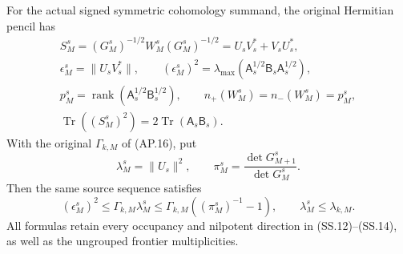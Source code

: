 \begin{theorem}
For the actual signed symmetric cohomology summand, the original
Hermitian pencil has
\[
 \begin{gathered}
 S_M^s=(G_M^s)^{-1/2}W_M^s(G_M^s)^{-1/2}
                           =U_sV_s^*+V_sU_s^*,\\
 \boxed{\epsilon_M^s=\|U_sV_s^*\|,\qquad
 (\epsilon_M^s)^2=
    \lambda_{\max}(\mathsf A_s^{1/2}\mathsf B_s
                                      \mathsf A_s^{1/2}),}\\
 p_M^s=\operatorname{rank}(\mathsf A_s^{1/2}\mathsf B_s^{1/2}),
 \qquad n_+(W_M^s)=n_-(W_M^s)=p_M^s,\\
 \operatorname{Tr}((S_M^s)^2)
                           =2\operatorname{Tr}(\mathsf A_s\mathsf B_s).
 \end{gathered}                                                \tag{AP.29}
\]
With the original \(\Gamma_{k,M}\) of (AP.16), put
\[
 \lambda_M^s=\|U_s\|^2,\qquad
 \pi_M^s=\frac{\det G_{M+1}^s}{\det G_M^s}.
\]
Then the same source sequence satisfies
\[
 \boxed{(\epsilon_M^s)^2\le\Gamma_{k,M}\lambda_M^s
          \le\Gamma_{k,M}((\pi_M^s)^{-1}-1),\qquad
          \lambda_M^s\le\lambda_{k,M}.}              \tag{AP.30}
\]
All formulas retain every occupancy and nilpotent direction in
(SS.12)--(SS.14), as well as the ungrouped frontier multiplicities.
\end{theorem}
